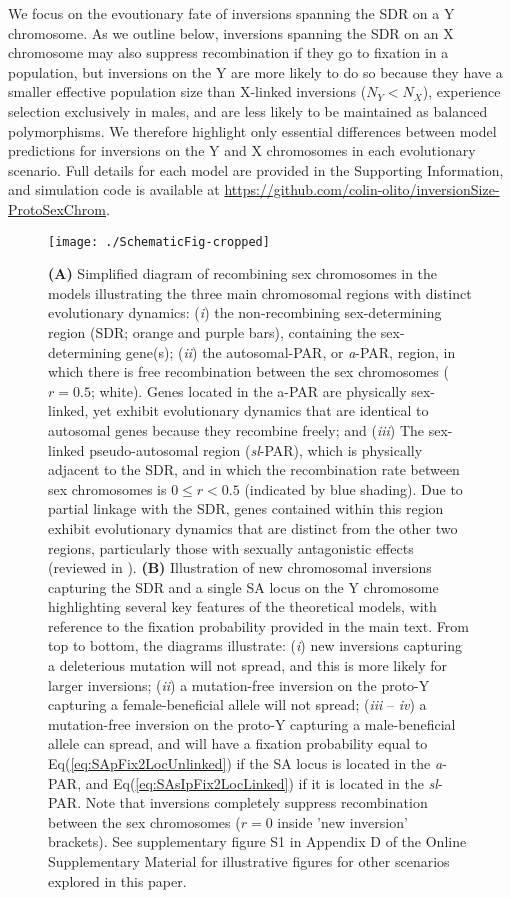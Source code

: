\documentclass{article}
\begin{document}
We focus on the evoutionary fate of inversions spanning the SDR on a Y chromosome. As we outline below, inversions spanning the SDR on an X chromosome may also suppress recombination if they go to fixation in a population, but inversions on the Y are more likely to do so because they have a smaller effective population size than X-linked inversions ($N_Y < N_X$), experience selection exclusively in males, and are less likely to be maintained as balanced polymorphisms. We therefore highlight only essential differences between model predictions for inversions on the Y and X chromosomes in each evolutionary scenario. Full details for each model are provided in the Supporting Information, and simulation code is available at \url{https://github.com/colin-olito/inversionSize-ProtoSexChrom}.


 \begin{figure}[htbp]
 \centering
 \texttt{[image: ./SchematicFig-cropped]}
 \caption{\textbf{(A)} Simplified diagram of recombining sex chromosomes in the models illustrating the three main chromosomal regions with distinct evolutionary dynamics: ({\itshape i}) the non-recombining sex-determining region (SDR; orange and purple bars), containing the sex-determining gene(s); ({\itshape ii}) the autosomal-PAR, or {\itshape a}-PAR, region, in which there is free recombination between the sex chromosomes ($r = 0.5$; white). Genes located in the a-PAR are physically sex-linked, yet exhibit evolutionary dynamics that are identical to autosomal genes because they recombine freely; and ({\itshape iii}) The sex-linked pseudo-autosomal region ({\itshape sl}-PAR), which is physically adjacent to the SDR, and in which the recombination rate between sex chromosomes is $0 \leq r < 0.5$ (indicated by blue shading). Due to partial linkage with the SDR, genes contained within this region exhibit evolutionary dynamics that are distinct from the other two regions, particularly those with sexually antagonistic effects (reviewed in \citealt{Otto2011}). \textbf{(B)} Illustration of new chromosomal inversions capturing the SDR and a single SA locus on the Y chromosome highlighting several key features of the theoretical models, with reference to the fixation probability provided in the main text. From top to bottom, the diagrams illustrate: ({\itshape i}) new inversions capturing a deleterious mutation will not spread, and this is more likely for larger inversions; ({\itshape ii}) a mutation-free inversion on the proto-Y capturing a female-beneficial allele will not spread; ({\itshape iii} -- {\itshape iv}) a mutation-free inversion on the proto-Y capturing a male-beneficial allele can spread, and will have a fixation probability equal to Eq(\ref{eq:SApFix2LocUnlinked}) if the SA locus is located in the {\itshape a}-PAR, and Eq(\ref{eq:SAsIpFix2LocLinked}) if it is located in the {\itshape sl}-PAR. Note that inversions completely suppress recombination between the sex chromosomes ($r = 0$ inside 'new inversion' brackets). See supplementary figure S1 in Appendix D of the Online Supplementary Material for illustrative figures for other scenarios explored in this paper.}
 \label{fig:diagramFig}
 \end{figure}
\end{document}
